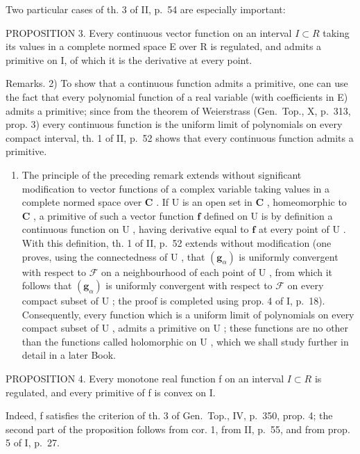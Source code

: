 Two particular cases of th. 3 of II, p.~54 are especially important:

PROPOSITION 3. Every continuous vector function on an interval \(I \subset R\) taking its values in a complete normed space E over R is regulated, and admits a primitive on I, of which it is the derivative at every point.

Remarks. 2) To show that a continuous function admits a primitive, one can use the fact that every polynomial function of a real variable (with coefficients in E) admits a primitive; since from the theorem of Weierstrass (Gen.~Top., X, p.~313, prop. 3) every continuous function is the uniform limit of polynomials on every compact interval, th. 1 of II, p.~52 shows that every continuous function admits a primitive.

\begin{enumerate}
\def\labelenumi{\arabic{enumi})}
\setcounter{enumi}{2}
\tightlist
\item
  The principle of the preceding remark extends without significant modification to vector functions of a complex variable taking values in a complete normed space over \(\mathbf{C}\) . If \(\mathrm{U}\) is an open set in \(\mathbf{C}\) , homeomorphic to \(\mathbf{C}\) , a primitive of such a vector function \(\mathbf{f}\) defined on \(\mathrm{U}\) is by definition a continuous function on \(\mathrm{U}\) , having derivative equal to \(\mathbf{f}\) at every point of \(\mathrm{U}\) . With this definition, th. 1 of II, p.~52 extends without modification (one proves, using the connectedness of \(\mathrm{U}\) , that \((\mathbf{g}_{\alpha})\) is uniformly convergent with respect to \(\mathcal{F}\) on a neighbourhood of each point of \(\mathrm{U}\) , from which it follows that \((\mathbf{g}_{\alpha})\) is uniformly convergent with respect to \(\mathcal{F}\) on every compact subset of \(\mathrm{U}\) ; the proof is completed using prop. 4 of I, p.~18). Consequently, every function which is a uniform limit of polynomials on every compact subset of \(\mathrm{U}\) , admits a primitive on \(\mathrm{U}\) ; these functions are no other than the functions called holomorphic on \(\mathrm{U}\) , which we shall study further in detail in a later Book.
\end{enumerate}

PROPOSITION 4. Every monotone real function f on an interval \(I \subset R\) is regulated, and every primitive of f is convex on I.

Indeed, f satisfies the criterion of th. 3 of Gen.~Top., IV, p.~350, prop. 4; the second part of the proposition follows from cor. 1, from II, p.~55, and from prop. 5 of I, p.~27.


